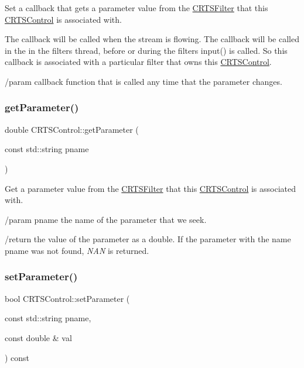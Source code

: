 Set a callback that gets a parameter value from the \hyperlink{classCRTSFilter}{C\+R\+T\+S\+Filter} that this \hyperlink{classCRTSControl}{C\+R\+T\+S\+Control} is associated with.

The callback will be called when the stream is flowing. The callback will be called in the in the filter\textquotesingle{}s thread, before or during the filter\textquotesingle{}s input() is called. So this callback is associated with a particular filter that owns this \hyperlink{classCRTSControl}{C\+R\+T\+S\+Control}.

/param callback function that is called any time that the parameter changes. \mbox{\label{classCRTSControl_a49b888b6fb53ca9f407b227cc6c93d9b}} 
\subsubsection{\texorpdfstring{get\+Parameter()}{getParameter()}\hspace{0.1cm}{\footnotesize\ttfamily [2/2]}}
{\footnotesize\ttfamily double C\+R\+T\+S\+Control\+::get\+Parameter (\begin{DoxyParamCaption}\item[{const std\+::string}]{pname }\end{DoxyParamCaption})\hspace{0.3cm}{\ttfamily [inline]}}

Get a parameter value from the \hyperlink{classCRTSFilter}{C\+R\+T\+S\+Filter} that this \hyperlink{classCRTSControl}{C\+R\+T\+S\+Control} is associated with.

/param pname the name of the parameter that we seek.

/return the value of the parameter as a double. If the parameter with the name {\ttfamily pname} was not found, {\itshape N\+AN} is returned. \mbox{\label{classCRTSControl_a80591c5f74bac27c33662884dfaa06ac}} 
\subsubsection{\texorpdfstring{set\+Parameter()}{setParameter()}}
{\footnotesize\ttfamily bool C\+R\+T\+S\+Control\+::set\+Parameter (\begin{DoxyParamCaption}\item[{const std\+::string}]{pname,  }\item[{const double \&}]{val }\end{DoxyParamCaption}) const\hspace{0.3cm}{\ttfamily [inline]}}

